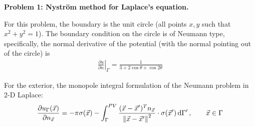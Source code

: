 \textbf{Problem 1: Nyström method for Laplace's equation.}

For this problem, the boundary is the unit circle (all points $x,y$ such that $x^2+y^2=1$).  The boundary condition on the circle is of Neumann type, specifically, the normal derivative of the potential (with the normal pointing out of the circle) is
\begin{align}
    \left. \frac{\partial{u}}{\partial{n}} \right|_\Gamma = \frac{1}{3+2\cos\theta +\cos2\theta}
\end{align}

For the exterior, the monopole integral formulation of the Neumann problem in 2-D Laplace:
\begin{align}
    \frac{\partial{u}_\Gamma (\vec{x})}{\partial{n}_{\vec{x}}}
    = -\pi\sigma(\vec{x}) - \int_\Gamma^{PV}
    \frac{(\vec{x}-\vec{x}')^Tn_{\vec{x}}}{\norm{\vec{x}-\vec{x}'}^2}\cdot \sigma(\vec{x}') \dd{\Gamma'},
    \qquad \vec{x}\in\Gamma
\end{align}

